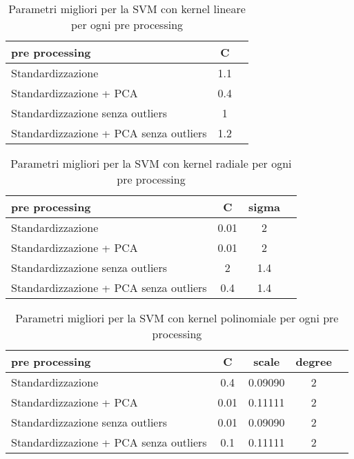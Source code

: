 \begin{table}[H]
\centering
\begin{tabular}{|l|c|c|}
\hline
\textbf{pre processing} & \textbf{C} \\ \hline
Standardizzazione & 1.1 \\ \hline
Standardizzazione + PCA & 0.4 \\ \hline
Standardizzazione senza outliers & 1 \\ \hline
Standardizzazione + PCA senza outliers & 1.2 \\ \hline
\end{tabular}
\caption{Parametri migliori per la SVM con kernel lineare per ogni pre processing}
\label{tab:my-table}
\end{table}

\begin{table}[H]
\centering
\begin{tabular}{|l|c|c|c|}
\hline
\textbf{pre processing} & \textbf{C} & \textbf{sigma} \\ \hline
Standardizzazione & 0.01 & 2 \\ \hline
Standardizzazione + PCA & 0.01 & 2 \\ \hline
Standardizzazione senza outliers & 2 & 1.4 \\ \hline
Standardizzazione + PCA senza outliers & 0.4 & 1.4 \\ \hline
\end{tabular}
\caption{Parametri migliori per la SVM con kernel radiale per ogni pre processing}
\label{tab:my-table}
\end{table}

\begin{table}[H]
\centering
\begin{tabular}{|l|c|c|c|c|}
\hline
\textbf{pre processing} & \textbf{C} & \textbf{scale} & \textbf{degree}\\ \hline
Standardizzazione & 0.4 & 0.09090 & 2 \\ \hline
Standardizzazione + PCA & 0.01 & 0.11111 & 2 \\ \hline
Standardizzazione senza outliers & 0.01 & 0.09090 & 2 \\ \hline
Standardizzazione + PCA senza outliers & 0.1 & 0.11111 & 2 \\ \hline
\end{tabular}
\caption{Parametri migliori per la SVM con kernel polinomiale per ogni pre processing}
\label{tab:my-table}
\end{table}
